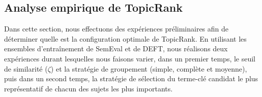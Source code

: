       \subsection{Analyse empirique de TopicRank}
      \label{subsec:main-automatic_keyphrase_annotation-unsupervised_automatic_keyphrase_extraction-evaluation-empirical_analysis_of_topicrank}
        Dans cette section, nous effectuons des expériences préliminaires afin
        de déterminer quelle est la configuration optimale de TopicRank. En
        utilisant les ensembles d'entraînement de SemEval et de DEFT, nous
        réalisons deux expériences durant lesquelles nous faisons varier, dans
        un premier temps, le seuil de similarité ($\zeta$) et la stratégie de
        groupement (simple, complète et moyenne), puis dans un second temps, la
        stratégie de sélection du terme-clé candidat le plus représentatif de
        chacun des sujets les plus importants.
